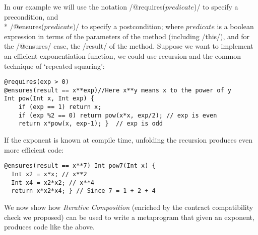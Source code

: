 In our example we will use the notation /@requires($predicate$)/ 
to specify a precondition, and\\* /@ensures($predicate$)/ 
to specify a postcondition; where $predicate$ is a boolean expression
in terms of the parameters of the method (including /this/), and for the /@ensures/ case, the /result/ of the method.
Suppose we want to implement an efficient exponentiation function, we could use recursion and the common technique of `repeated squaring':
\vspace{-1ex}
\begin{lstlisting}
@requires(exp > 0)
@ensures(result == x**exp)//Here x**y means x to the power of y
Int pow(Int x, Int exp) {
	if (exp == 1) return x;
	if (exp %2 == 0) return pow(x*x, exp/2); // exp is even
	return x*pow(x, exp-1); }  // exp is odd
\end{lstlisting}
If the exponent is known at compile time,
unfolding the recursion produces even more efficient code:
\vspace{-1ex}
\begin{lstlisting}
@ensures(result == x**7) Int pow7(Int x) { 
  Int x2 = x*x; // x**2
  Int x4 = x2*x2; // x**4
  return x*x2*x4; } // Since 7 = 1 + 2 + 4
\end{lstlisting}
\vspace{-1ex}

We now show how \emph{Iterative Composition} %
(enriched by the contract compatibility check we proposed) %
can be used to write a metaprogram that given an exponent, produces code like the above.
 
